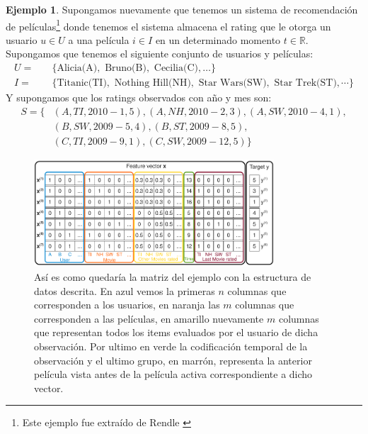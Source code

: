 \documentclass[hidelinks,12pt,a4paper]{book}
\theoremstyle{plain}
\theoremstyle{definition}
\newtheorem{ejemplo}{{\textbf{Ejemplo}}}[chapter]
\begin{document}
\begin{ejemplo}
Supongamos nuevamente que tenemos un sistema de recomendación de películas\footnote{Este ejemplo fue extraído de Rendle \cite{rendle2010factorization}} donde tenemos el sistema almacena el rating que le otorga un usuario $u\in U$ a una película $i \in I$ en un determinado momento $t \in \mathbb{R}$. Supongamos que tenemos el siguiente conjunto de usuarios y películas:
\begin{align*}
U=&\quad\{\text{Alicia(A)},\text{ Bruno(B)},\text{ Cecilia(C)}, \ldots \} \\
I=&\quad\{\text{Titanic(TI)},\text{ Nothing Hill(NH)},\text{ Star Wars(SW)},\text{ Star Trek(ST)}, \cdots \} 
\end{align*}
Y supongamos que los ratings observados con año y mes son:
\begin{align*}
S = \{&(A, TI, 2010-1, 5),(A, NH, 2010-2, 3),(A, SW, 2010-4, 1),\\
&(B, SW, 2009-5, 4),(B, ST, 2009-8, 5),\\
&(C, TI, 2009-9, 1),(C, SW, 2009-12, 5)\}
\end{align*}

\begin{figure}[!ht]
\centering
\includegraphics[width=0.8\textwidth]{rendle-ej.png}
\caption{Así es como quedaría la matriz del ejemplo con la estructura de datos descrita. En azul vemos la primeras $n$ columnas que corresponden a los usuarios, en naranja las $m$ columnas que corresponden a las películas, en amarillo nuevamente $m$ columnas que representan todos los items evaluados por el usuario de dicha observación. Por ultimo en verde la codificación temporal de la observación y el ultimo grupo, en marrón, representa la anterior película vista antes de la película activa correspondiente a dicho vector.}\label{fig:fm-ejemplo-full}
\end{figure}


\end{ejemplo}
\end{document}
